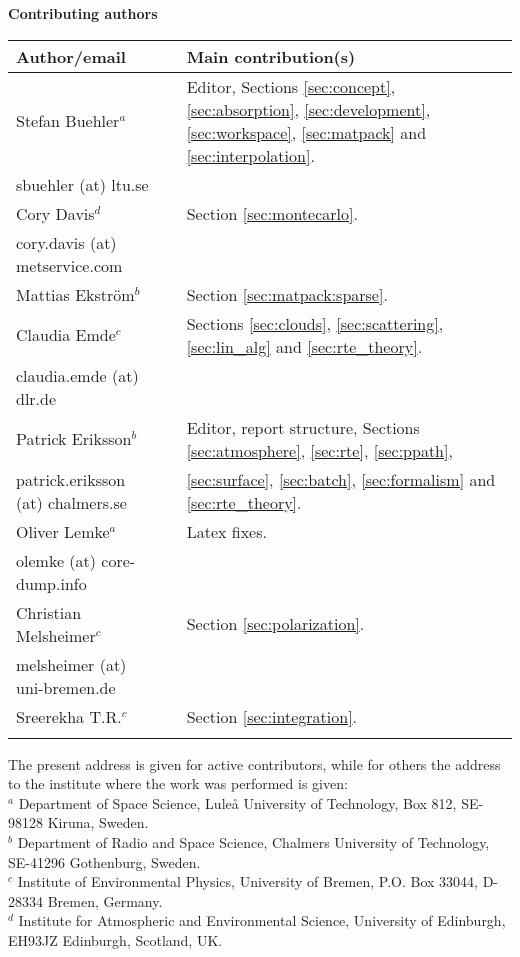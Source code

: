 \documentclass[11pt,twoside,a4paper,fleqn]{book}
\begin{document}
%
\newpage
\thispagestyle{plain}
%
\begin{center}
  {\Large \bf Contributing authors}
\end{center}
\vspace*{10mm}
\begin{tabular}{lp{10mm}l}
  \hline
  {\bf Author/email} & & {\bf Main contribution(s)} \\
  \hline
  Stefan Buehler$^a$ & & Editor, Sections \ref{sec:concept},  
  \ref{sec:absorption}, \ref{sec:development}, \ref{sec:workspace},
  \ref{sec:matpack} and \ref{sec:interpolation}.\\
  sbuehler (at) ltu.se & &        \\
  \hline
  Cory Davis$^d$ & & Section \ref{sec:montecarlo}. \\
  cory.davis (at) metservice.com & & \\
  \hline
  Mattias Ekstr\"om$^b$ & & Section \ref{sec:matpack:sparse}. \\
  \hline
  Claudia Emde$^c$ & & Sections \ref{sec:clouds}, \ref{sec:scattering},
  \ref{sec:lin_alg} and \ref{sec:rte_theory}.\\
  claudia.emde (at) dlr.de & & \\
  \hline
  Patrick Eriksson$^b$ &  & Editor, report structure, 
  Sections \ref{sec:atmosphere}, \ref{sec:rte}, \ref{sec:ppath}, \\
  patrick.eriksson (at) chalmers.se & & 
  \ref{sec:surface}, \ref{sec:batch}, \ref{sec:formalism} and 
  \ref{sec:rte_theory}.\\
  \hline
  Oliver Lemke$^a$ & & Latex fixes.\\
  olemke (at) core-dump.info & & \\
  \hline
  Christian Melsheimer$^c$ & & Section \ref{sec:polarization}.\\
  melsheimer (at) uni-bremen.de & & \\
  \hline
  Sreerekha T.R.$^c$ & & Section \ref{sec:integration}.\\
  \hline
  &&\\
\end{tabular}

\noindent
The present address is given for active contributors, while for others
the address to the institute where the work was performed is given:\\
$^a$ Department of Space Science, Lule{\aa} University of Technology, 
Box 812, SE-98128 Kiruna, Sweden. \\
$^b$ Department of Radio and Space Science, Chalmers University of Technology,
SE-41296 Gothenburg, Sweden. \\
$^c$ Institute of Environmental Physics, University of Bremen, P.O. Box 33044, 
D-28334 Bremen, Germany. \\
$^d$ Institute for Atmospheric and Environmental Science, University of 
Edinburgh, EH93JZ Edinburgh, Scotland, UK. \\
\end{document}
